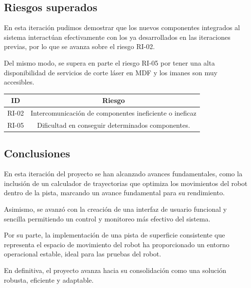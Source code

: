 \subsection{Riesgos superados}
En esta iteración pudimos demostrar que los nuevos componentes integrados al sistema interactúan efectivamente con los ya desarrollados en las iteraciones previas, por lo que se avanza sobre el riesgo RI-02.

Del mismo modo, se supera en parte el riesgo RI-05 por tener una alta disponibilidad de servicios de corte láser en MDF y los imanes son muy accesibles.

\begin{center}
\begin{tabular}{|c|c|} 
    \hline \rowcolor{test_header_color}
        ID & Riesgo \\
    \hline
        RI-02 & Intercomunicación de componentes ineficiente o ineficaz \\
    \hline
        RI-05 & Dificultad en conseguir determinados componentes. \\
    \hline
\end{tabular}
\end{center}

\subsection{Conclusiones}

En esta iteración del proyecto se han alcanzado avances fundamentales, como la inclusión de un calculador de trayectorias que optimiza los movimientos del robot dentro de la pista, marcando un avance fundamental para su rendimiento.

Asimismo, se avanzó con la creación de una interfaz de usuario funcional y sencilla permitiendo un control y monitoreo más efectivo del sistema. 

Por su parte, la implementación de una pista de superficie consistente que representa el espacio de movimiento del robot ha proporcionado un entorno operacional estable, ideal para las pruebas del robot.

En definitiva, el proyecto avanza hacia su consolidación como una solución robusta, eficiente y adaptable.